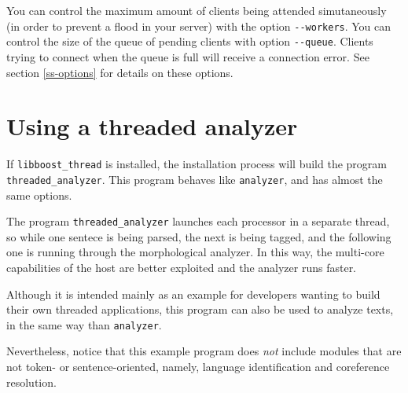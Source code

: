 \documentclass[a4paper]{book}
\begin{document}
 You can control the maximum amount of clients being attended
 simutaneously (in order to prevent a flood in your server) with the
 option \verb#--workers#.  You can control the size of the queue of
 pending clients with option \verb#--queue#. Clients trying to connect
 when the queue is full will receive a connection error.
 See section \ref{ss-options} for details on these options.
\medskip

\section{Using a threaded analyzer}

 If \verb#libboost_thread# is installed, the installation process will
 build the program \verb#threaded_analyzer#. This program behaves 
 like \verb#analyzer#, and has almost the same options. 

 The program \verb#threaded_analyzer# launches each processor in a
 separate thread, so while one sentece is being parsed, the next is
 being tagged, and the following one is running through the
 morphological analyzer.
 In this way, the multi-core capabilities of the host are better
 exploited and the analyzer runs faster.

 Although it is intended mainly as an example for developers wanting
 to build their own threaded applications, this program can also be 
 used to analyze texts, in the same way than \verb#analyzer#.

 Nevertheless, notice that this example program does {\sl not} include
 modules that are not token- or sentence-oriented, namely, language 
 identification and coreference resolution.
\end{document}
